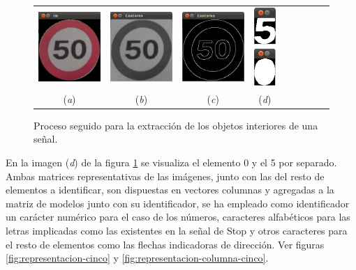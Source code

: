 \begin{figure}[H]
  \begin{center}
      \begin{tabular}{ccccc p{3cm}p{3cm}p{3cm}p{1cm}}
        \includegraphics[width=3cm]{./imagenes/mascara/mascara3.png} &  \includegraphics[width=3cm]{./imagenes/prototipo3/Contornogris.png} &  \includegraphics[width=3cm]{./imagenes/prototipo3/contorno.png} &  \includegraphics[width=0.95cm]{./imagenes/prototipo3/elementos2.png} \\
        {(\emph{a})} & {(\emph{b})} & {(\emph{c})} & {(\emph{d})} \\
      \end{tabular}
    \caption{Proceso seguido para la extracción de los objetos interiores de una señal.}
    \label{fig:pasos-prototipo3}
  \end{center}
\end{figure}

En la imagen (\emph{d}) de la figura \ref{fig:pasos-prototipo3} se visualiza el elemento 0 y el 5 por separado. Ambas matrices representativas de las imágenes, junto con las del resto de elementos a identificar, son dispuestas en vectores columnas y agregadas a la matriz de modelos junto con su identificador, se ha empleado como identificador un carácter numérico para el caso de los números, caracteres alfabéticos para las letras implicadas como las existentes en la señal de Stop y otros caracteres para el resto de elementos como las flechas indicadoras de dirección. Ver figuras \ref{fig:representacion-cinco} y \ref{fig:representacion-columna-cinco}.\\

